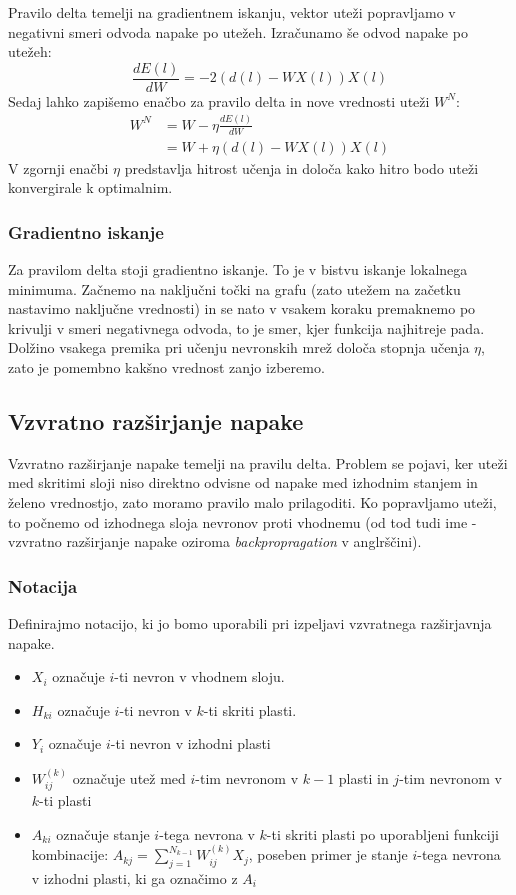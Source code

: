 \documentclass[mat1]{fmfdelo}
\begin{document}
Pravilo delta temelji na gradientnem iskanju, vektor uteži popravljamo v negativni smeri odvoda napake po utežeh. Izračunamo še odvod napake po utežeh:
%
\begin{equation*}
\frac{dE(l)}{dW}= -2(d(l)-WX(l))X(l)
\end{equation*}
%
Sedaj lahko zapišemo enačbo za pravilo delta in nove vrednosti uteži $W^{N}$:
%
\begin{equation}
\begin{aligned}
W^{N} &= W - \eta\frac{dE(l)}{dW} \\
&= W + \eta(d(l)-WX(l))X(l)
\label{utezi}
\end{aligned}
\end{equation}
%
V zgornji enačbi $\eta$ predstavlja hitrost učenja in določa kako hitro bodo uteži konvergirale k optimalnim. 

\subsubsection{Gradientno iskanje} 
Za pravilom delta stoji gradientno iskanje. To je v bistvu iskanje lokalnega minimuma. Začnemo na naključni točki na grafu (zato utežem na začetku nastavimo naključne vrednosti) in se nato v vsakem koraku premaknemo po krivulji v smeri negativnega odvoda, to je smer, kjer funkcija najhitreje pada. Dolžino vsakega premika pri učenju nevronskih mrež določa stopnja učenja $\eta$, zato je pomembno kakšno vrednost zanjo izberemo.

\subsection{Vzvratno razširjanje napake}
Vzvratno razširjanje napake temelji na pravilu delta. Problem se pojavi, ker uteži med skritimi sloji niso direktno odvisne od napake med izhodnim stanjem in želeno vrednostjo, zato moramo pravilo malo prilagoditi. Ko popravljamo uteži, to počnemo od izhodnega sloja nevronov proti vhodnemu (od tod tudi ime -  vzvratno razširjanje napake oziroma \emph{backpropragation} v anglrščini). 

\subsubsection{Notacija}
Definirajmo notacijo, ki jo bomo uporabili pri izpeljavi vzvratnega razširjavnja napake. 
\begin{itemize}
\item $X_{i}$ označuje $i$-ti nevron v vhodnem sloju.
\item $H_{ki}$ označuje $i$-ti nevron v $k$-ti skriti plasti.
\item $Y_i$ označuje $i$-ti nevron v izhodni plasti
\item $W^{(k)}_{ij}$ označuje utež med $i$-tim nevronom v  $k-1$ plasti in $j$-tim nevronom v $k$-ti plasti
\item $A_{ki}$ označuje stanje $i$-tega nevrona v $k$-ti skriti plasti po uporabljeni funkciji kombinacije: $A_{kj} = \sum^{N_{k-1}}_{j=1}W^{(k)}_{ij}X_j$, poseben primer je stanje $i$-tega nevrona v izhodni plasti, ki ga označimo z $A_i$
\end{itemize}
\end{document}
